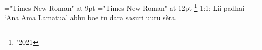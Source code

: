 \font\footnotescriptureText="Times New Roman" at 9pt
\font\scriptureText="Times New Roman" at 12pt
  \footnote {\char "2021} {1:1: Lii padhai ‘Ana Ama Lamatua’ abhu boe tu dara sasuri uuru
                  sèra.}

\bye
